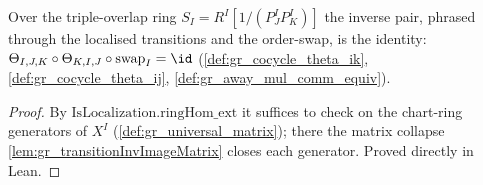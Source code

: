 \begin{lemma}

\leanok
[The residual inverse pair \(\theta_{I,K} \circ \theta_{K,I} = \id\)]
  \label{lem:gr_transitionInvPair}
  Over the triple-overlap ring \(S_I = R^I[1/(P^I_J P^I_K)]\) the inverse pair, phrased through the
  localised transitions and the order-swap, is the identity:
  \(\Theta_{I,J,K} \circ \Theta_{K,I,J} \circ \mathrm{swap}_I = \id\)
  (\cref{def:gr_cocycle_theta_ik}, \cref{def:gr_cocycle_theta_ij},
  \cref{def:gr_away_mul_comm_equiv}).
\end{lemma}
\begin{proof}

\leanok
  By \(\mathrm{IsLocalization.ringHom\_ext}\) it suffices to check on the chart-ring generators of
  \(X^I\) (\cref{def:gr_universal_matrix}); there the matrix collapse
  \cref{lem:gr_transitionInvImageMatrix} closes each generator. Proved directly in Lean.
\end{proof}

